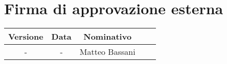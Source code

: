 \section*{Firma di approvazione esterna}
    \begin{table}[h]
        \centering
        \renewcommand{\arraystretch}{1.5}
        \begin{tabularx}{0.98\textwidth}
            {c c c >{\centering\arraybackslash}X X}
            \rowcolor{black}
            \textbf{\color{white} Versione} & \textbf{\color{white} Data} & \textbf{\color{white} Nominativo} & \multicolumn{2}{c}{\textbf{\color{white} Firma}}\\ 
            \hline
            
            \multirow{2}{*}{-} &\multirow{2}{*}{-} &\multirow{2}{*}{Matteo Bassani} &&\\

            &&&\multicolumn{2}{c}{\hrulefill}\\
            \hline
        \end{tabularx}
    \end{table}